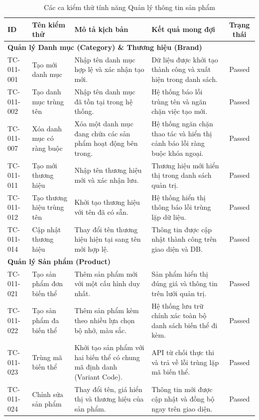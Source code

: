 \begin{table}[H]
\centering
\caption{Các ca kiểm thử tính năng Quản lý thông tin sản phẩm}
\label{tab:tc_product_management}
\small
\begin{tabularx}{\textwidth}{|l|X|X|X|c|}
\hline
\textbf{ID} & \textbf{Tên kiểm thử} & \textbf{Mô tả kịch bản} & \textbf{Kết quả mong đợi} & \textbf{Trạng thái} \\ \hline
\multicolumn{5}{|l|}{\textbf{Quản lý Danh mục (Category) \& Thương hiệu (Brand)}} \\ \hline
TC-011-001 & Tạo mới danh mục & Nhập tên danh mục hợp lệ và xác nhận tạo mới. & Dữ liệu được khởi tạo thành công và xuất hiện trong danh sách. & Passed \\ \hline
TC-011-002 & Tạo danh mục trùng tên & Nhập tên danh mục đã tồn tại trong hệ thống. & Hệ thống báo lỗi trùng tên và ngăn chặn việc tạo mới. & Passed \\ \hline
TC-011-007 & Xóa danh mục có ràng buộc & Xóa một danh mục đang chứa các sản phẩm hoạt động bên trong. & Hệ thống ngăn chặn thao tác và hiển thị cảnh báo lỗi ràng buộc khóa ngoại. & Passed \\ \hline
TC-011-011 & Tạo mới thương hiệu & Nhập tên thương hiệu mới và xác nhận lưu. & Thương hiệu mới hiển thị trong danh sách quản trị. & Passed \\ \hline
TC-011-012 & Tạo thương hiệu trùng tên & Khởi tạo thương hiệu với tên đã có sẵn. & Hệ thống hiển thị thông báo lỗi trùng lặp dữ liệu. & Passed \\ \hline
TC-011-014 & Cập nhật thương hiệu & Thay đổi tên thương hiệu hiện tại sang tên mới hợp lệ. & Thông tin được cập nhật thành công trên giao diện và DB. & Passed \\ \hline
\multicolumn{5}{|l|}{\textbf{Quản lý Sản phẩm (Product)}} \\ \hline
TC-011-021 & Tạo sản phẩm đơn biến thể & Thêm sản phẩm mới với một cấu hình duy nhất. & Sản phẩm hiển thị đúng giá và thông tin trên lưới quản trị. & Passed \\ \hline
TC-011-022 & Tạo sản phẩm đa biến thể & Thêm sản phẩm kèm theo nhiều lựa chọn bộ nhớ, màu sắc. & Hệ thống lưu trữ chính xác toàn bộ danh sách biến thể đi kèm. & Passed \\ \hline
TC-011-023 & Trùng mã biến thể & Khởi tạo sản phẩm với hai biến thể có chung mã định danh (Variant Code). & API từ chối thực thi và trả về lỗi trùng lặp mã biến thể. & Passed \\ \hline
TC-011-024 & Chỉnh sửa sản phẩm & Thay đổi tên, giá hiển thị và thương hiệu của sản phẩm. & Thông tin mới được cập nhật và đồng bộ ngay trên giao diện. & Passed \\ \hline

\end{tabularx}
\end{table}
